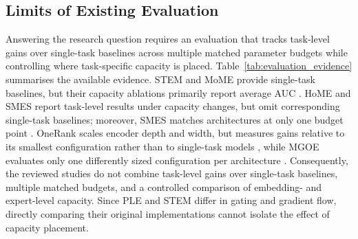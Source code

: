 \subsection{Limits of Existing Evaluation}
Answering the research question requires an evaluation that tracks task-level gains over single-task baselines across multiple matched parameter budgets while controlling where task-specific capacity is placed. Table~\ref{tab:evaluation_evidence} summarises the available evidence. STEM and MoME provide single-task baselines, but their capacity ablations primarily report average AUC \citep{Su2024STEM, Xu2024MoME}. HoME and SMES report task-level results under capacity changes, but omit corresponding single-task baselines; moreover, SMES matches architectures at only one budget point \citep{wang2025home, Zhang2026SMES}. OneRank scales encoder depth and width, but measures gains relative to its smallest configuration rather than to single-task models \citep{Tang2026OneRank}, while MGOE evaluates only one differently sized configuration per architecture \citep{Yao2026MGOE}. Consequently, the reviewed studies do not combine task-level gains over single-task baselines, multiple matched budgets, and a controlled comparison of embedding- and expert-level capacity. Since PLE and STEM differ in gating and gradient flow, directly comparing their original implementations cannot isolate the effect of capacity placement.

